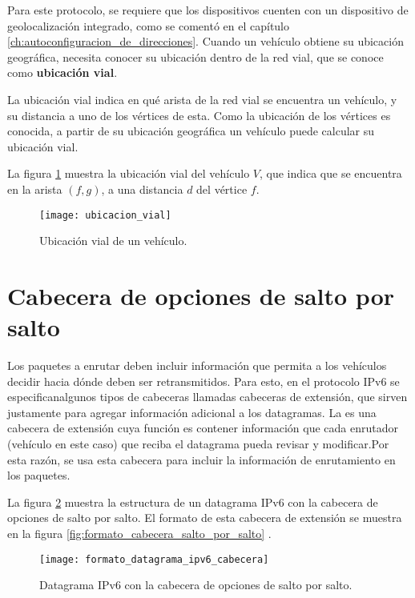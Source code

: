 Para este protocolo, se requiere que los dispositivos cuenten con un dispositivo
de geolocalización integrado, como se comentó en el capítulo
\ref{ch:autoconfiguracion_de_direcciones}. Cuando un vehículo obtiene su
ubicación geográfica, necesita conocer su ubicación dentro de la red vial, que
se conoce como \textbf{ubicación vial}.

La ubicación vial indica en qué arista de la red vial se encuentra un vehículo,
y su distancia a uno de los vértices de esta. Como la ubicación de los vértices
es conocida, a partir de su ubicación geográfica un vehículo puede calcular su
ubicación vial.

La figura \ref{fig:ubicacion_vial} muestra la ubicación vial del vehículo $V$,
que indica que se encuentra en la arista $(f,g)$, a una distancia $d$ del
vértice $f$.

\begin{figure}[th!]
\centering
\texttt{[image: ubicacion\_vial]} 
\decoRule
\caption[Ubicación vial de un vehículo]{Ubicación vial de un vehículo.}
\label{fig:ubicacion_vial}
\end{figure}

\section{Cabecera de opciones de salto por salto}
\label{sec:cabecera_opciones}

Los paquetes a enrutar deben incluir información que permita a los vehículos
decidir hacia dónde deben ser retransmitidos. Para esto, en el protocolo IPv6 se
especificanalgunos tipos de cabeceras llamadas cabeceras de extensión, que
sirven justamente para agregar información adicional a los datagramas. La
 es una cabecera de extensión
cuya función es contener información que cada enrutador (vehículo en este caso)
que reciba el datagrama pueda revisar y modificar.Por esta razón, se usa esta
cabecera para incluir la información de enrutamiento en los paquetes.

La figura \ref{fig:formato_datagrama_ipv6_cabecera} muestra la estructura de un
datagrama IPv6 con la cabecera de opciones de salto por salto. El formato de
esta cabecera de extensión se muestra en la figura
\ref{fig:formato_cabecera_salto_por_salto} \cite{RFC2460}.

\begin{figure}[th!]
\centering
\texttt{[image: formato\_datagrama\_ipv6\_cabecera]} 
\decoRule
\caption[Datagrama IPv6 con la cabecera de opciones de salto por
salto]{Datagrama IPv6 con la cabecera de opciones de salto por salto.}
\label{fig:formato_datagrama_ipv6_cabecera}
\end{figure}

